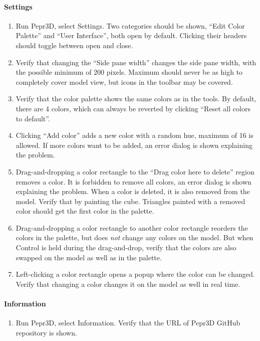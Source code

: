 \paragraph{Settings}

\begin{enumerate}
\item Run Pepr3D, select Settings. Two categories should be shown, ``Edit Color Palette'' and ``User Interface'', both open by default. Clicking their headers should toggle between open and close.
\item Verify that changing the ``Side pane width'' changes the side pane width, with the possible minimum of 200 pixels. Maximum should never be as high to completely cover model view, but icons in the toolbar may be covered.
\item Verify that the color palette shows the same colors as in the tools. By default, there are 4 colors, which can always be reverted by clicking ``Reset all colors to default''.
\item Clicking ``Add color'' adds a new color with a random hue, maximum of 16 is allowed. If more colors want to be added, an error dialog is shown explaining the problem.
\item Drag-and-dropping a color rectangle to the ``Drag color here to delete'' region removes a color. It is forbidden to remove all colors, an error dialog is shown explaining the problem. When a color is deleted, it is also removed from the model. Verify that by painting the cube. Triangles painted with a removed color should get the first color in the palette.
\item Drag-and-dropping a color rectangle to another color rectangle reorders the colors in the palette, but does \emph{not} change any colors on the model. But when Control is held during the drag-and-drop, verify that the colors are also swapped on the model as well as in the palette.
\item Left-clicking a color rectangle opens a popup where the color can be changed. Verify that changing a color changes it on the model as well in real time.
\end{enumerate}

\paragraph{Information}

\begin{enumerate}
\item Run Pepr3D, select Information. Verify that the URL of Pepr3D GitHub repository is shown.
\end{enumerate}


